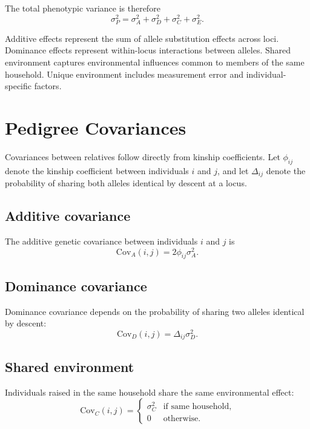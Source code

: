 \documentclass[11pt]{article}
\begin{document}
The total phenotypic variance is therefore
\begin{equation}
\sigma_P^2 = \sigma_A^2 + \sigma_D^2 + \sigma_C^2 + \sigma_E^2 .
\end{equation}

Additive effects represent the sum of allele substitution effects across loci.  
Dominance effects represent within-locus interactions between alleles.  
Shared environment captures environmental influences common to members of 
the same household.  
Unique environment includes measurement error and individual-specific factors.

\section{Pedigree Covariances}

Covariances between relatives follow directly from kinship coefficients.  
Let $\phi_{ij}$ denote the kinship coefficient between individuals $i$ and $j$, 
and let $\Delta_{ij}$ denote the probability of sharing both alleles identical 
by descent at a locus.

\subsection{Additive covariance}

The additive genetic covariance between individuals $i$ and $j$ is
\begin{equation}
\mathrm{Cov}_A(i,j) = 2\phi_{ij}\sigma_A^2 .
\end{equation}

\subsection{Dominance covariance}

Dominance covariance depends on the probability of sharing two alleles 
identical by descent:
\begin{equation}
\mathrm{Cov}_D(i,j) = \Delta_{ij}\sigma_D^2 .
\end{equation}

\subsection{Shared environment}

Individuals raised in the same household share the same environmental effect:
\begin{equation}
\mathrm{Cov}_C(i,j) =
\begin{cases}
\sigma_C^2 & \text{if same household},\\
0 & \text{otherwise}.
\end{cases}
\end{equation}
\end{document}
